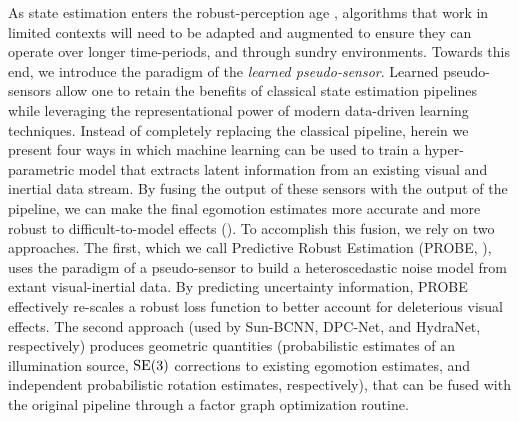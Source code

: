 As state estimation enters the robust-perception age \citep{Cadena2016-ds}, algorithms that work in limited contexts will need to be adapted and augmented to ensure they can operate over longer time-periods, and through sundry environments. Towards this end, we introduce the paradigm of the \textit{learned pseudo-sensor}. Learned pseudo-sensors allow one to retain the benefits of classical state estimation pipelines while leveraging the representational power of modern data-driven learning techniques. Instead of completely replacing the classical pipeline, herein we present four ways in which machine learning can be used to train a hyper-parametric model that extracts latent information from an existing visual and inertial data stream. By fusing the output of these sensors with the output of the pipeline, we can make the final egomotion estimates more accurate and more robust to difficult-to-model effects (). To accomplish this fusion, we rely on two approaches. The first, which we call Predictive Robust Estimation (PROBE, ), uses the paradigm of a pseudo-sensor to build a heteroscedastic noise model from extant visual-inertial data. By predicting uncertainty information, PROBE effectively re-scales a robust loss function to better account for deleterious visual effects. The second approach (used by Sun-BCNN, DPC-Net, and HydraNet,   respectively) produces geometric quantities (probabilistic estimates of an illumination source, $\mathrm{SE}(3)$ corrections to existing egomotion estimates, and independent probabilistic rotation estimates, respectively), that can be fused with the original pipeline through a factor graph optimization routine.


